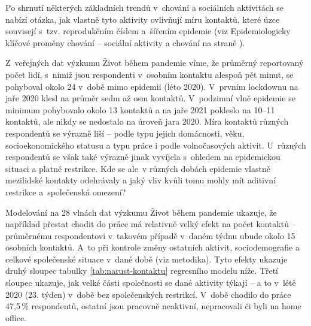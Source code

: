 Po shrnutí některých základních trendů v chování a sociálních aktivitách se nabízí otázka, jak vlastně tyto aktivity ovlivňují míru kontaktů, které úzce souvisejí s tzv. reprodukčním číslem a šířením epidemie (viz Epidemiologicky klíčové proměny chování – sociální aktivity a chování na straně \pageref{Epidemi_promeny}). 

Z veřejných dat výzkumu Život během pandemie víme, že průměrný reportovaný počet lidí, s nimiž jsou respondenti v osobním kontaktu alespoň pět minut, se pohyboval okolo 24 v době mimo epidemii (léto 2020). V prvním lockdownu na jaře 2020 klesl na průměr sedm až osm kontaktů. V podzimní vlně epidemie se minimum pohybovalo okolo 13 kontaktů a na jaře 2021 pokleslo na 10--11 kontaktů, ale nikdy se nedostalo na úroveň jara 2020. Míra kontaktů různých respondentů se výrazně liší – podle typu jejich domácnosti, věku, socioekonomického statusu a typu práce i podle volnočasových aktivit. U~různých respondentů se však také výrazně jinak vyvíjela s ohledem na epidemickou situaci a platné restrikce. Kde se ale v různých dobách epidemie vlastně mezilidské kontakty odehrávaly a jaký vliv kvůli tomu mohly mít aditivní restrikce a společenská omezení? 

Modelování na 28 vlnách dat výzkumu Život během pandemie ukazuje, že například přestat chodit do práce má relativně velký efekt na počet kontaktů – průměrnému respondentovi v takovém případě v daném týdnu ubude okolo 15 osobních kontaktů. A~to při kontrole změny ostatních aktivit, sociodemografie a celkové společenské situace v dané době (viz metodika). Tyto efekty ukazuje druhý sloupec tabulky \ref{tab:narust-kontaktu} regresního modelu níže. Třetí sloupec ukazuje, jak velké části společnosti se dané aktivity týkají – a to v létě 2020 (23. týden)
v době bez společenských restrikcí. V době chodilo do práce 47,5\,\% respondentů, ostatní jsou pracovně neaktivní, nepracovali či byli na home office. 


